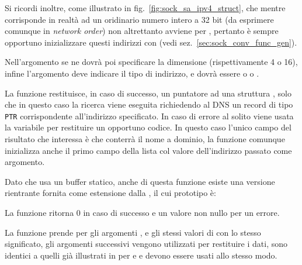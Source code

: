 Si ricordi inoltre, come illustrato in fig.~\ref{fig:sock_sa_ipv4_struct}, che
mentre  corrisponde in realtà ad un oridinario numero intero
a 32 bit  (da esprimere comunque in \textit{network order}) non altrettanto
avviene per , pertanto è sempre opportuno inizializzare
questi indirizzi con  (vedi
sez.~\ref{sec:sock_conv_func_gen}).

Nell'argomento  se ne dovrà poi specificare la dimensione
(rispettivamente 4 o 16), infine l'argomento
 deve indicare il tipo di indirizzo, e dovrà essere o
 o .

La funzione restituisce, in caso di successo, un puntatore ad una struttura
, solo che in questo caso la ricerca viene eseguita
richiedendo al DNS un record di tipo \texttt{PTR} corrispondente all'indirizzo
specificato. In caso di errore al solito viene usata la variabile
 per restituire un opportuno codice. In questo caso l'unico
campo del risultato che interessa è  che conterrà il nome a
dominio, la funzione comunque inizializza anche il primo campo della lista
 col valore dell'indirizzo passato come argomento.

Dato che  usa un buffer statico, anche di questa funzione
esiste una versione rientrante  fornita come
estensione dalla , il cui prototipo è:

\begin{funcproto}{
}

{La funzione ritorna $0$ in caso di successo e un valore non nullo per un errore.}
\end{funcproto}

La funzione prende per gli argomenti ,  e 
gli stessi valori di  con lo stesso significato, gli
argomenti successivi vengono utilizzati per restituire i dati, sono identici a
quelli già illustrati in per  e
 e devono essere usati allo stesso modo.

